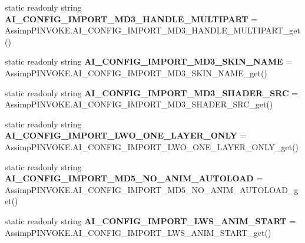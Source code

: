 \begin{DoxyCompactItemize}
\item 
\hypertarget{class_assimp_a0cc69e536687766aa7931e966aa5aea8}{static readonly string {\bfseries A\+I\+\_\+\+C\+O\+N\+F\+I\+G\+\_\+\+I\+M\+P\+O\+R\+T\+\_\+\+M\+D3\+\_\+\+H\+A\+N\+D\+L\+E\+\_\+\+M\+U\+L\+T\+I\+P\+A\+R\+T} = Assimp\+P\+I\+N\+V\+O\+K\+E.\+A\+I\+\_\+\+C\+O\+N\+F\+I\+G\+\_\+\+I\+M\+P\+O\+R\+T\+\_\+\+M\+D3\+\_\+\+H\+A\+N\+D\+L\+E\+\_\+\+M\+U\+L\+T\+I\+P\+A\+R\+T\+\_\+get()}\label{class_assimp_a0cc69e536687766aa7931e966aa5aea8}

\item 
\hypertarget{class_assimp_a5b22345a8da2a6fd448c200b19b77f53}{static readonly string {\bfseries A\+I\+\_\+\+C\+O\+N\+F\+I\+G\+\_\+\+I\+M\+P\+O\+R\+T\+\_\+\+M\+D3\+\_\+\+S\+K\+I\+N\+\_\+\+N\+A\+M\+E} = Assimp\+P\+I\+N\+V\+O\+K\+E.\+A\+I\+\_\+\+C\+O\+N\+F\+I\+G\+\_\+\+I\+M\+P\+O\+R\+T\+\_\+\+M\+D3\+\_\+\+S\+K\+I\+N\+\_\+\+N\+A\+M\+E\+\_\+get()}\label{class_assimp_a5b22345a8da2a6fd448c200b19b77f53}

\item 
\hypertarget{class_assimp_a9232d37a0dc3443b925ca5096669703e}{static readonly string {\bfseries A\+I\+\_\+\+C\+O\+N\+F\+I\+G\+\_\+\+I\+M\+P\+O\+R\+T\+\_\+\+M\+D3\+\_\+\+S\+H\+A\+D\+E\+R\+\_\+\+S\+R\+C} = Assimp\+P\+I\+N\+V\+O\+K\+E.\+A\+I\+\_\+\+C\+O\+N\+F\+I\+G\+\_\+\+I\+M\+P\+O\+R\+T\+\_\+\+M\+D3\+\_\+\+S\+H\+A\+D\+E\+R\+\_\+\+S\+R\+C\+\_\+get()}\label{class_assimp_a9232d37a0dc3443b925ca5096669703e}

\item 
\hypertarget{class_assimp_a5577f27c69b10fe0ca42579ae1247864}{static readonly string {\bfseries A\+I\+\_\+\+C\+O\+N\+F\+I\+G\+\_\+\+I\+M\+P\+O\+R\+T\+\_\+\+L\+W\+O\+\_\+\+O\+N\+E\+\_\+\+L\+A\+Y\+E\+R\+\_\+\+O\+N\+L\+Y} = Assimp\+P\+I\+N\+V\+O\+K\+E.\+A\+I\+\_\+\+C\+O\+N\+F\+I\+G\+\_\+\+I\+M\+P\+O\+R\+T\+\_\+\+L\+W\+O\+\_\+\+O\+N\+E\+\_\+\+L\+A\+Y\+E\+R\+\_\+\+O\+N\+L\+Y\+\_\+get()}\label{class_assimp_a5577f27c69b10fe0ca42579ae1247864}

\item 
\hypertarget{class_assimp_a5fc3335d36391057521256af3a395e4f}{static readonly string {\bfseries A\+I\+\_\+\+C\+O\+N\+F\+I\+G\+\_\+\+I\+M\+P\+O\+R\+T\+\_\+\+M\+D5\+\_\+\+N\+O\+\_\+\+A\+N\+I\+M\+\_\+\+A\+U\+T\+O\+L\+O\+A\+D} = Assimp\+P\+I\+N\+V\+O\+K\+E.\+A\+I\+\_\+\+C\+O\+N\+F\+I\+G\+\_\+\+I\+M\+P\+O\+R\+T\+\_\+\+M\+D5\+\_\+\+N\+O\+\_\+\+A\+N\+I\+M\+\_\+\+A\+U\+T\+O\+L\+O\+A\+D\+\_\+get()}\label{class_assimp_a5fc3335d36391057521256af3a395e4f}

\item 
\hypertarget{class_assimp_a4d599620aef4f37a8a901ffacb7e1263}{static readonly string {\bfseries A\+I\+\_\+\+C\+O\+N\+F\+I\+G\+\_\+\+I\+M\+P\+O\+R\+T\+\_\+\+L\+W\+S\+\_\+\+A\+N\+I\+M\+\_\+\+S\+T\+A\+R\+T} = Assimp\+P\+I\+N\+V\+O\+K\+E.\+A\+I\+\_\+\+C\+O\+N\+F\+I\+G\+\_\+\+I\+M\+P\+O\+R\+T\+\_\+\+L\+W\+S\+\_\+\+A\+N\+I\+M\+\_\+\+S\+T\+A\+R\+T\+\_\+get()}\label{class_assimp_a4d599620aef4f37a8a901ffacb7e1263}


\end{DoxyCompactItemize}

